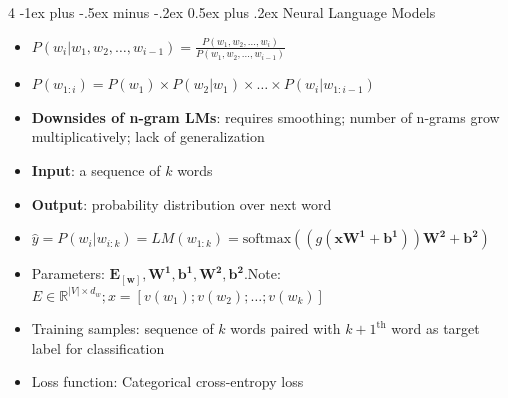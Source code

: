\documentclass[10pt, landscape]{article}
\makeatletter
\renewcommand{\subsection}{\@startsection{subsection}{2}{0mm}%
  {-1ex plus -.5ex minus -.2ex}%
  {0.5ex plus .2ex}%
{\normalfont\normalsize\bfseries}}
\makeatother
\begin{document}
\begin{multicols*}{4}
  \subsection{Neural Language Models}
  \begin{itemize}
    \item $P(w_i|w_1,w_2,\dots ,w_{i-1}) = \frac{P(w_1,w_2,\dots ,w_i)}{P(w_1,w_2,\dots ,w_{i-1})}$
    \item $P(w_{1:i}) = P(w_1) \times P(w_2|w_1) \times \dots \times P(w_i|w_{1:i-1})$
    \item \textbf{Downsides of n-gram LMs}: requires smoothing; number of n-grams grow multiplicatively; lack of generalization
    \item \textbf{Input}: a sequence of $k$ words 
    \item \textbf{Output}: probability distribution over next word
    \item $\hat{y} = P(w_i|w_{i:k}) = LM(w_{1:k}) = \text{softmax}((g(\mathbf{xW^1+b^1}))\mathbf{W^2+b^2})$
    \item Parameters: $\mathbf{E_{[w]}, W^1, b^1, W^2, b^2}$.\newline Note: $E \in \mathbb{R}^{|V|\times d_w}; x=[v(w_1);v(w_2);\dots;v(w_k)]$
    \item Training samples: sequence of $k$ words paired with $k+1^{\text{th}}$ word as target label for classification
    \item Loss function: Categorical cross-entropy loss
  \end{itemize}


\end{multicols*}
\end{document}
